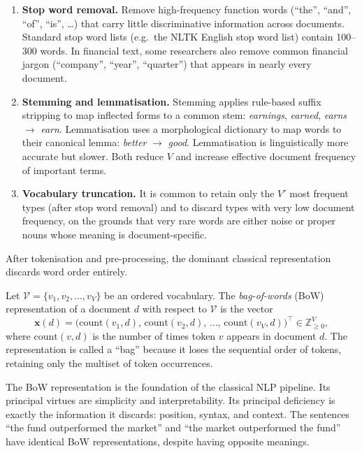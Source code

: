 \begin{deepdive}
\begin{enumerate}
  \item \textbf{Stop word removal.} Remove high-frequency function words (``the'',
    ``and'', ``of'', ``is'', \ldots) that carry little discriminative information across
    documents.  Standard stop word lists (e.g.\ the NLTK English stop word list) contain
    100--300 words.  In financial text, some researchers also remove common financial
    jargon (``company'', ``year'', ``quarter'') that appears in nearly every document.

  \item \textbf{Stemming and lemmatisation.} Stemming applies rule-based suffix stripping
    to map inflected forms to a common stem: \textit{earnings}, \textit{earned},
    \textit{earns} $\to$ \textit{earn}.  Lemmatisation uses a morphological dictionary to
    map words to their canonical lemma: \textit{better} $\to$ \textit{good}.
    Lemmatisation is linguistically more accurate but slower.  Both reduce $V$ and
    increase effective document frequency of important terms.

  \item \textbf{Vocabulary truncation.} It is common to retain only the $V'$ most
    frequent types (after stop word removal) and to discard types with very low document
    frequency, on the grounds that very rare words are either noise or proper nouns
    whose meaning is document-specific.
\end{enumerate}

After tokenisation and pre-processing, the dominant classical representation discards
word order entirely.

\begin{definition}
\label{def:bow}
Let $\mathcal{V} = \{v_1, v_2, \ldots, v_V\}$ be an ordered vocabulary.  The
\emph{bag-of-words} (BoW) representation of a document $d$ with respect to
$\mathcal{V}$ is the vector
\[
  \mathbf{x}(d) = \bigl(\mathrm{count}(v_1, d),\,
                         \mathrm{count}(v_2, d),\, \ldots,\,
                         \mathrm{count}(v_V, d)\bigr)^\top \in \mathbb{Z}_{\geq 0}^V,
\]
where $\mathrm{count}(v, d)$ is the number of times token $v$ appears in document $d$.
The representation is called a ``bag'' because it loses the sequential order of tokens,
retaining only the multiset of token occurrences.
\end{definition}

The BoW representation is the foundation of the classical NLP pipeline.  Its principal
virtues are simplicity and interpretability.  Its principal deficiency is exactly the
information it discards: position, syntax, and context.  The sentences ``the fund
outperformed the market'' and ``the market outperformed the fund'' have identical BoW
representations, despite having opposite meanings.


\end{deepdive}
